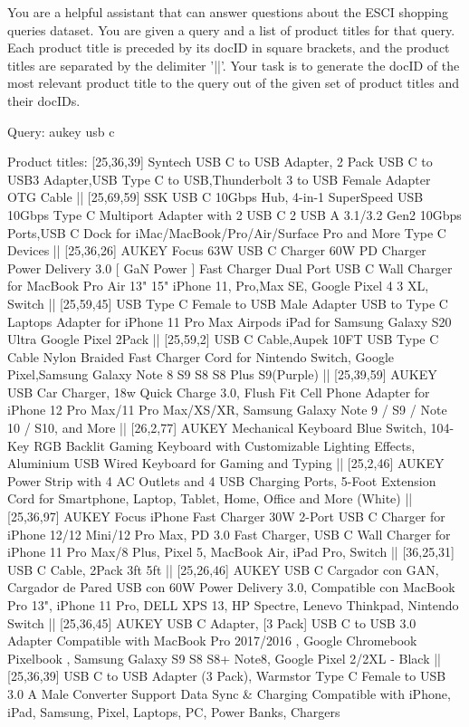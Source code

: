 \documentclass[11pt, a4paper, onecolumn, confidential, copyright, gdm]{google}
\begin{document}
\begin{tcolorbox}[promptbox]
\ttfamily
You are a helpful assistant that can answer questions about the ESCI shopping queries dataset. You are given a query and a list of product titles for that query. Each product title is preceded by its docID in square brackets, and the product titles are separated by the delimiter '||'. Your task is to generate the docID of the most relevant product title to the query out of the given set of product titles and their docIDs.

\vspace{0.5em} %

Query:
aukey usb c

\vspace{0.5em} %

Product titles:
[25,36,39] Syntech USB C to USB Adapter, 2 Pack USB C to USB3 Adapter,USB Type C to USB,Thunderbolt 3 to USB Female Adapter OTG Cable || [25,69,59] SSK USB C 10Gbps Hub, 4-in-1 SuperSpeed USB 10Gbps Type C Multiport Adapter with 2 USB C 2 USB A 3.1/3.2 Gen2 10Gbps Ports,USB C Dock for iMac/MacBook/Pro/Air/Surface Pro and More Type C Devices || [25,36,26] AUKEY Focus 63W USB C Charger 60W PD Charger Power Delivery 3.0 [ GaN Power ] Fast Charger Dual Port USB C Wall Charger for MacBook Pro Air 13" 15" iPhone 11, Pro,Max SE, Google Pixel 4 3 XL, Switch || [25,59,45] USB Type C Female to USB Male Adapter USB to Type C Laptops Adapter for iPhone 11 Pro Max Airpods iPad for Samsung Galaxy S20 Ultra Google Pixel 2Pack || [25,59,2] USB C Cable,Aupek 10FT USB Type C Cable Nylon Braided Fast Charger Cord for Nintendo Switch, Google Pixel,Samsung Galaxy Note 8 S9 S8 S8 Plus S9(Purple) || [25,39,59] AUKEY USB Car Charger, 18w Quick Charge 3.0, Flush Fit Cell Phone Adapter for iPhone 12 Pro Max/11 Pro Max/XS/XR, Samsung Galaxy Note 9 / S9 / Note 10 / S10, and More || [26,2,77] AUKEY Mechanical Keyboard Blue Switch, 104-Key RGB Backlit Gaming Keyboard with Customizable Lighting Effects, Aluminium USB Wired Keyboard for Gaming and Typing || [25,2,46] AUKEY Power Strip with 4 AC Outlets and 4 USB Charging Ports, 5-Foot Extension Cord for Smartphone, Laptop, Tablet, Home, Office and More (White) || [25,36,97] AUKEY Focus iPhone Fast Charger 30W 2-Port USB C Charger for iPhone 12/12 Mini/12 Pro Max, PD 3.0 Fast Charger, USB C Wall Charger for iPhone 11 Pro Max/8 Plus, Pixel 5, MacBook Air, iPad Pro, Switch || [36,25,31] USB C Cable, 2Pack 3ft 5ft || [25,26,46] AUKEY USB C Cargador con GAN, Cargador de Pared USB con 60W Power Delivery 3.0, Compatible con MacBook Pro 13", iPhone 11 Pro, DELL XPS 13, HP Spectre, Lenevo Thinkpad, Nintendo Switch || [25,36,45] AUKEY USB C Adapter, [3 Pack] USB C to USB 3.0 Adapter Compatible with MacBook Pro 2017/2016 , Google Chromebook Pixelbook , Samsung Galaxy S9 S8 S8+ Note8, Google Pixel 2/2XL - Black || [25,36,39] USB C to USB Adapter (3 Pack), Warmstor Type C Female to USB 3.0 A Male Converter Support Data Sync \& Charging Compatible with iPhone, iPad, Samsung, Pixel, Laptops, PC, Power Banks, Chargers


\end{tcolorbox}
\end{document}
